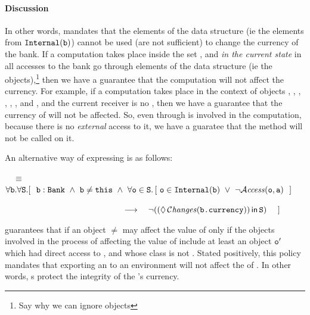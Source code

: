 \documentclass[acmsmall,screen]{acmart}
\begin{document}
\paragraph{Discussion}
In other words,   mandates that the elements of the data structure (ie the elements from ${\mbox{\tt{Internal}}}({\mbox{\tt{b}}})$) cannot be used (are not sufficient) to  change the currency of the bank. If a computation takes place inside the set , and {\em in the current state} in 
all accesses to the bank go through elements of the data structure (ie the  objects),\footnote{Say why we can ignore  objects} then we have a guarantee that the computation will not affect the currency.
For example, if a computation takes place in the context of objects , , , , , ,  and , and the current receiver is no , then we have a guarantee that the currency of  will not be affected. So, even through  is involved in the computation, because there is no {\em external} access to it, we have a guaratee that the method  will not be called on it.

An alternative way of expressing  is as follows:


 \ \  $\equiv$ \ \
  $\forall \prg{b}.\forall \prg{S}.
  [ \ \  \prg{b}:
  \prg{Bank}\ \wedge\   \prg{b}\neq\prg{this}\ \wedge\  \forall \prg{o} \in \prg{S}.\, [\ \prg{o}\in\prg{Internal}(\prg{b}) \ \vee\  \neg  \CanAccess{\prg{o}}{\prg{a}}  \ \ ]$
\\ \hfill \strut $~   \ \ \ \hspace{1.7in}  \  \ \longrightarrow \ \ \ \neg(
 \Using{(\Future\Changes{\prg{b.currency}})}{\prg{S}})\   \  \ \ ]$

\vspace{.01in}

\vspace{.01in}
  guarantees
that if an object $\neq$ may affect the value of  only if the  objects
involved in the process of affecting the value of \prg{b.Currency}  include at least an object ${\mbox{\tt{o}}}'$
which had direct access to \prg{b}, and
whose class is  not  . Stated positively, this policy mandates
that exporting an \prg{Account} to an environment will not affect the  of .
In other words,
s protect the integrity of the 's currency.
\end{document}

